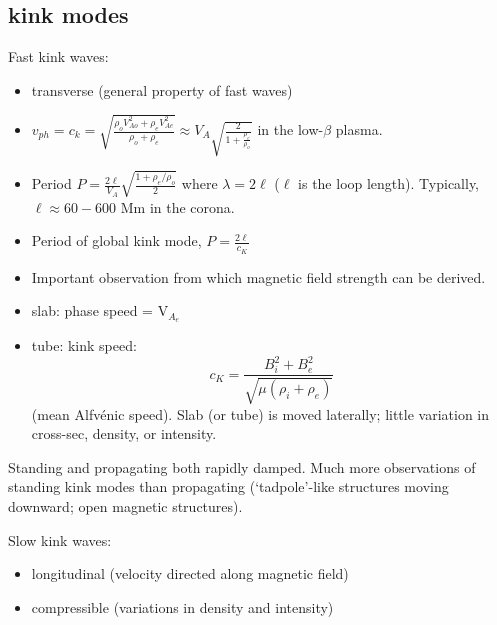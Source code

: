 \documentclass{article}
\begin{document}
\subsection{kink modes}
Fast kink waves:
\begin{itemize}
    \item transverse (general property of fast waves)
    \item $v_{ph} = c_k = \sqrt{\frac{\rho_oV^2_{Ao}+\rho_eV^2_{Ae}}
        {\rho_o+\rho_e}} \approx V_A\sqrt{\frac{2}{1+\frac{\rho_e}{\rho_o}}} $
        in the low-$\beta$ plasma.
    \item Period $P=\frac{2\ell}{V_A}\sqrt{\frac{1+\rho_e/\rho_o}{2}}$
        where $\lambda=2\ell$ ($\ell$ is the loop length).
        Typically, $\ell \approx 60-600$ Mm in the corona.
    \item Period of global kink mode, $P = \frac{2\ell}{c_K}$
    \item Important observation from which magnetic field strength
        can be derived.
    \item slab: phase speed = V$_{A_e}$
    \item tube: kink speed:
        $$ c_K = \frac{B_i^2 + B_e^2}{\sqrt{\mu(\rho_i+\rho_e)}} $$
        (mean Alfv\'enic speed).
        Slab (or tube) is moved laterally; little variation in cross-sec,
        density, or intensity.
\end{itemize}
Standing and propagating both rapidly damped. Much more observations of
standing kink modes than propagating (`tadpole'-like structures moving
downward; open magnetic structures).

Slow kink waves:
\begin{itemize}
    \item longitudinal (velocity directed along magnetic field)
    \item compressible (variations in density and intensity)
\end{itemize}
\end{document}
